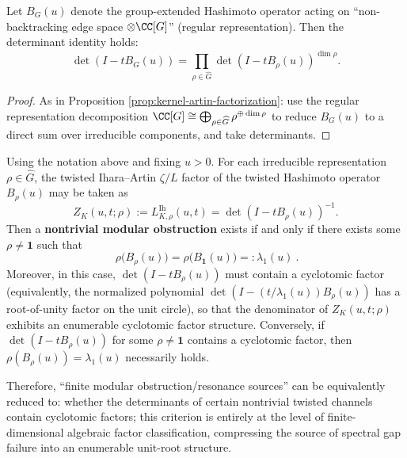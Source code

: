 \begin{proposition}\label{prop:ihara-artin-factorization}
Let \(B_{G}(u)\) denote the group-extended Hashimoto operator acting on ``non-backtracking edge space \(\otimes\CC[G]\)'' (regular representation). Then the determinant identity holds:
\[
\det(I-tB_{G}(u))=\prod_{\rho\in\widehat G}\det(I-tB_{\rho}(u))^{\dim\rho}.
\]
\end{proposition}

\begin{proof}
As in Proposition \ref{prop:kernel-artin-factorization}: use the regular representation decomposition
\(
\CC[G]\cong\bigoplus_{\rho\in\widehat G}\rho^{\oplus \dim\rho}
\)
to reduce \(B_G(u)\) to a direct sum over irreducible components, and take determinants. \qedhere
\end{proof}

\begin{theorem}\label{thm:conclusion75-ihara-cyclotomic-factor-classification}
Using the notation above and fixing \(u>0\).
For each irreducible representation \(\rho\in\widehat G\), the twisted Ihara--Artin \(\zeta/L\) factor of the twisted Hashimoto operator \(B_\rho(u)\) may be taken as
\[
Z_{K}(u,t;\rho):=L^{\mathrm{Ih}}_{K,\rho}(u,t)=\det(I-tB_\rho(u))^{-1}.
\]
Then a \textbf{nontrivial modular obstruction} exists if and only if there exists some \(\rho\neq\mathbf 1\) such that
\[
\boxed{\ \rho\!\bigl(B_\rho(u)\bigr)=\rho\!\bigl(B_{\mathbf 1}(u)\bigr)=:\lambda_1(u)\ }.
\]
Moreover, in this case, \(\det(I-tB_\rho(u))\) must contain a cyclotomic factor (equivalently, the normalized polynomial \(\det(I-(t/\lambda_1(u))B_\rho(u))\) has a root-of-unity factor on the unit circle), so that the denominator of \(Z_K(u,t;\rho)\) exhibits an enumerable cyclotomic factor structure.
Conversely, if \(\det(I-tB_\rho(u))\) for some \(\rho\neq\mathbf 1\) contains a cyclotomic factor, then \(\rho(B_\rho(u))=\lambda_1(u)\) necessarily holds.
\par
Therefore, ``finite modular obstruction/resonance sources'' can be equivalently reduced to: whether the determinants of certain nontrivial twisted channels contain cyclotomic factors; this criterion is entirely at the level of finite-dimensional algebraic factor classification, compressing the source of spectral gap failure into an enumerable unit-root structure.
\end{theorem}


